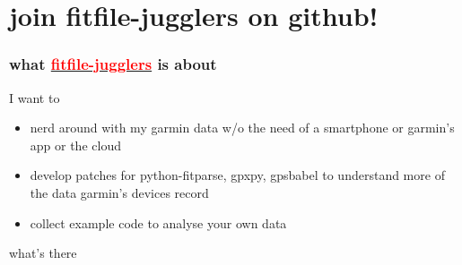 \documentclass[table,xcolor=dvipsnames,professionalfonts]{beamer}
\newcommand{\myhref}[2]{\href{#1}{\textcolor{red}{#2}}}
\begin{document}
\section{join {fitfile-jugglers} on github!}
\begin{frame}
  \frametitle{what \myhref{https://github.com/pseyfert/fitfile-jugglers}{fitfile-jugglers} is about}
  \begin{block}{I want to}
    \begin{itemize}
    \item nerd around with my garmin data w/o the need of a smartphone or garmin's app or the cloud
    \item develop patches for python-fitparse, gpxpy, gpsbabel to understand more of the data garmin's devices record
    \item collect example code to analyse your own data
    \end{itemize}
  \end{block}
  \begin{exampleblock}{what's there}
\end{exampleblock}
\end{frame}
\end{document}
